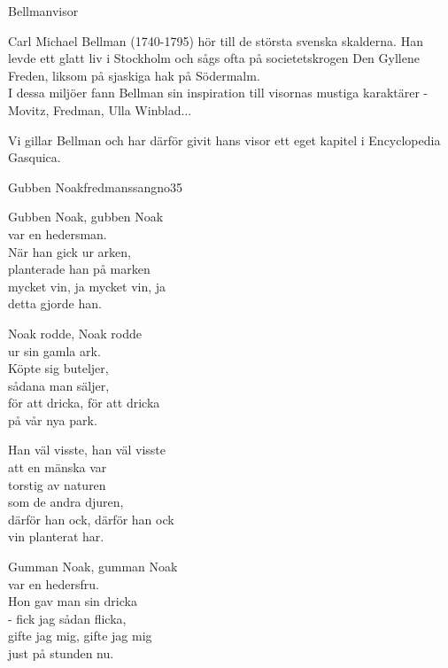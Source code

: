 \begin{flushleft}
{\Huge Bellmanvisor\\}
\vspace{1cm}
\Large {Carl Michael Bellman (1740-1795) hör till de största svenska
skalderna. Han levde ett glatt liv i Stockholm och sågs ofta
på societetskrogen Den Gyllene Freden, liksom på sjaskiga hak på
Södermalm.\\
I dessa miljöer fann Bellman sin inspiration till visornas mustiga karaktärer - Movitz, Fredman, Ulla Winblad...

Vi gillar Bellman och har därför givit hans visor ett eget kapitel i
Encyclopedia Gasquica.}
\end{flushleft}

\newpage

\begin{song}{Gubben Noak}{fredmanssangno35}
\begin{vers}
Gubben Noak, gubben Noak \\
var en hedersman.\\
När han gick ur arken,\\
planterade han på marken\\
mycket vin, ja mycket vin, ja\\
detta gjorde han.\\
\end{vers}
\begin{vers}
Noak rodde, Noak rodde \\
ur sin gamla ark.\\
Köpte sig buteljer,\\
sådana man säljer,\\
för att dricka, för att dricka\\
på vår nya park.\\
\end{vers}


\begin{vers}
Han väl visste, han väl visste \\
att en mänska var\\
torstig av naturen\\
som de andra djuren,\\
därför han ock, därför han ock\\
vin planterat har.\\
\end{vers}

\newp

\begin{vers}
Gumman Noak, gumman Noak \\
var en hedersfru.\\
Hon gav man sin dricka\\
- fick jag sådan flicka,\\
gifte jag mig, gifte jag mig\\
just på stunden nu.\\
\end{vers}
\end{song}


